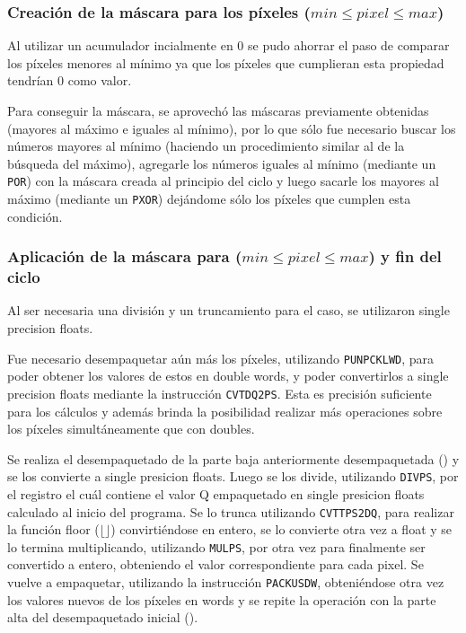 \subsubsection{Creación de la máscara para los píxeles ($min \leq pixel \leq max$)}
Al utilizar un acumulador incialmente en 0 se pudo ahorrar el paso de comparar los píxeles menores al mínimo ya que los píxeles que cumplieran esta propiedad tendrían 0 como valor.

Para conseguir la máscara, se aprovechó las máscaras previamente obtenidas (mayores al máximo e iguales al mínimo), por lo que sólo fue necesario buscar los números mayores al mínimo (haciendo un procedimiento similar al de la búsqueda del máximo), agregarle los números iguales al mínimo (mediante un \texttt{POR}) con la máscara creada al principio del ciclo y luego sacarle los mayores al máximo (mediante un \texttt{PXOR}) dejándome sólo los píxeles que cumplen esta condición.

\subsubsection{Aplicación de la máscara para ($min \leq pixel \leq max$) y fin del ciclo}
Al ser necesaria una división y un truncamiento para el caso, se utilizaron single precision floats.

Fue necesario desempaquetar aún más los píxeles, utilizando \texttt{PUNPCKLWD}, para poder obtener los valores de estos en double words, y poder convertirlos a single precision floats mediante la instrucción \texttt{CVTDQ2PS}. Esta es precisión suficiente para los cálculos y además brinda la posibilidad realizar más operaciones sobre los píxeles simultáneamente que con doubles.

Se realiza el desempaquetado de la parte baja anteriormente desempaquetada () y se los convierte a single presicion floats. Luego se los divide, utilizando \texttt{DIVPS}, por el registro  el cuál contiene el valor Q empaquetado en single presicion floats calculado al inicio del programa. Se lo trunca utilizando \texttt{CVTTPS2DQ}, para realizar la función floor ($\lfloor \rfloor$) convirtiéndose en entero, se lo convierte otra vez a float y se lo termina multiplicando, utilizando \texttt{MULPS}, por  otra vez para finalmente ser convertido a entero, obteniendo el valor correspondiente para cada pixel. Se vuelve a empaquetar, utilizando la instrucción \texttt{PACKUSDW}, obteniéndose otra vez los valores nuevos de los píxeles en words y se repite la operación con la parte alta del desempaquetado inicial ().

